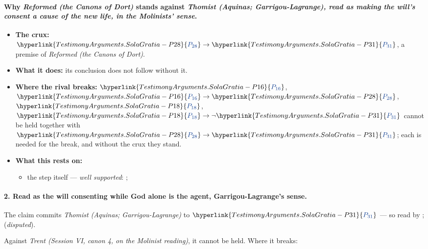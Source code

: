 \documentclass[11pt]{article}
\newcommand{\pvar}[2]{\hyperlink{#1-P#2}{\textcolor{claimlink}{P_{#2}}}}
\begin{document}
\paragraph{Why \emph{Reformed (the Canons of Dort)} stands against \emph{Thomist (Aquinas; Garrigou-Lagrange), read as making the will’s consent a cause of the new life, in the Molinists’ sense}.}
\begin{itemize}
\item \textbf{The crux:} \(\pvar{TestimonyArguments.SolaGratia}{28} \rightarrow \pvar{TestimonyArguments.SolaGratia}{31}\), a premise of \emph{Reformed (the Canons of Dort)}.
\item \textbf{What it does:} its conclusion does not follow without it.
\item \textbf{Where the rival breaks:} \(\pvar{TestimonyArguments.SolaGratia}{16}\), \(\pvar{TestimonyArguments.SolaGratia}{16} \rightarrow \pvar{TestimonyArguments.SolaGratia}{28}\), \(\pvar{TestimonyArguments.SolaGratia}{18}\), \(\pvar{TestimonyArguments.SolaGratia}{18} \rightarrow \lnot \pvar{TestimonyArguments.SolaGratia}{31}\) cannot be held together with \(\pvar{TestimonyArguments.SolaGratia}{28} \rightarrow \pvar{TestimonyArguments.SolaGratia}{31}\); each is needed for the break, and without the crux they stand.
\item \textbf{What this rests on:}
\begin{itemize}
\item the step itself --- \emph{well supported}: \cite[Solid Declaration II.89]{concordia-triglotta-1921}; \cite[Canons of Dort, III/IV, art. 12]{schaff-creeds-christendom-3-1977}
\end{itemize}
\end{itemize}
\paragraph{2. Read as the will consenting while God alone is the agent, Garrigou-Lagrange’s sense.} The claim commits \emph{Thomist (Aquinas; Garrigou-Lagrange)} to \(\pvar{TestimonyArguments.SolaGratia}{31}\) --- so read by \cite[ch. X]{garrigou-lagrange-grace-1952}; \cite[I-II q.111 a.2 ad 2]{aquinas-summa-1920} (\emph{disputed}).

Against \emph{Trent (Session VI, canon 4, on the Molinist reading)}, it cannot be held. Where it breaks:
\end{document}
